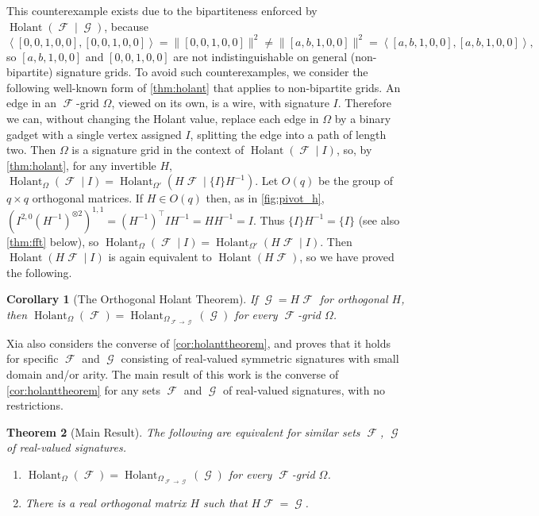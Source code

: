 \documentclass{article}
\newtheorem{theorem}{Theorem}\newtheorem{lemma}[theorem]{Lemma}\newtheorem{proposition}[theorem]{Proposition}\newtheorem{corollary}[theorem]{Corollary}\newtheorem{definition}[theorem]{Definition}\newtheorem{claim}[theorem]{Claim}\newtheorem{remark}[theorem]{Remark}\newtheorem{conjecture}[theorem]{Conjecture}
\DeclareMathOperator{\fc}{\mathcal{F}}
\DeclareMathOperator{\gc}{\mathcal{G}}
\DeclareMathOperator{\holant}{Holant}
\begin{document}
This counterexample exists due to 
the bipartiteness enforced by $\holant(\fc \mid \gc)$, because
\[
    \left\langle [0,0,1,0,0],[0,0,1,0,0]\right\rangle = \|[0,0,1,0,0]\|^2
    \neq \|[a,b,1,0,0]\|^2 = \left\langle [a,b,1,0,0],[a,b,1,0,0] \right\rangle,
\]
so $[a,b,1,0,0]$ and $[0,0,1,0,0]$ are not indistinguishable on
general (non-bipartite) signature grids. To avoid such counterexamples, we consider the
following well-known form of \autoref{thm:holant} that applies to non-bipartite grids.
An edge in an $\fc$-grid $\Omega$, viewed on its own, is a wire,
with signature $I$. Therefore we can, without changing the Holant value, replace each edge in 
$\Omega$ by a binary gadget with a single vertex assigned $I$, splitting the edge into a path
of length two. Then $\Omega$ is a signature grid in the context of
$\holant(\fc \mid I)$, so, by \autoref{thm:holant}, for any invertible $H$,
$\holant_\Omega(\fc \mid I) = \holant_{\Omega'}(H\fc \mid \{I\}H^{-1})$. 
Let $O(q)$ be the group of $q \times q$ orthogonal matrices.
If $H \in O(q)$ then, as in \autoref{fig:pivot_h}, $(I^{2,0} (H^{-1})^{\otimes 2})^{1,1}
= (H^{-1})^\top I H^{-1} = H H^{-1} = I$. Thus $\{I\} H^{-1} = \{I\}$ 
(see also \autoref{thm:fft} below), so
$\holant_\Omega(\fc \mid I) = \holant_{\Omega'}(H\fc \mid I)$. Then $\holant(H\fc \mid I)$
is again equivalent to $\holant(H\fc)$, so we have proved the following.
\begin{corollary}[The Orthogonal Holant Theorem]
    \label{cor:holanttheorem}
    If $\gc = H\fc$ for orthogonal $H$, then $\holant_\Omega(\fc) = \holant_{\Omega_{\fc\to\gc}}(\gc)$ for every $\fc$-grid $\Omega$.
\end{corollary}
Xia \cite{xia} also considers the converse of \autoref{cor:holanttheorem}, and proves that it holds
for specific $\fc$ and $\gc$ consisting of real-valued symmetric signatures with small domain
and/or arity.
The main result of this work is the converse of \autoref{cor:holanttheorem} for any
sets $\fc$ and $\gc$ of real-valued signatures, with no restrictions.
\begin{theorem}[Main Result]
    \label{thm:result}
    The following are equivalent for similar sets $\fc$, $\gc$ of real-valued signatures. 
    \begin{enumerate}[label=(\roman*)]
        \item $\holant_{\Omega}(\fc) = \holant_{\Omega_{\fc\to\gc}}(\gc)$
        for every $\fc$-grid $\Omega$.
        \item There is a real orthogonal matrix $H$ such that $H\fc = \gc$.
    \end{enumerate}
\end{theorem}
\end{document}
